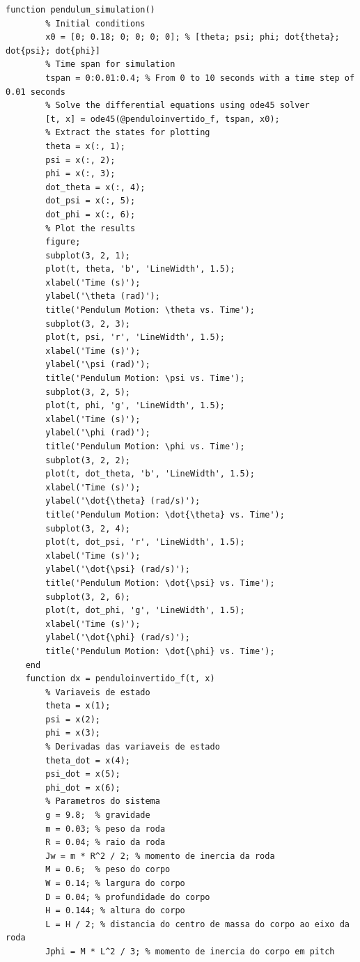 \documentclass[10pt]{article}
\begin{document}
\begin{appendices}
\begin{lstlisting}[caption={Código da simulação do sistema com ode45}, label=lst:pendulum_sim_l]
    function pendulum_simulation()
        % Initial conditions
        x0 = [0; 0.18; 0; 0; 0; 0]; % [theta; psi; phi; dot{theta}; dot{psi}; dot{phi}]
        % Time span for simulation
        tspan = 0:0.01:0.4; % From 0 to 10 seconds with a time step of 0.01 seconds
        % Solve the differential equations using ode45 solver
        [t, x] = ode45(@penduloinvertido_f, tspan, x0);
        % Extract the states for plotting
        theta = x(:, 1);
        psi = x(:, 2);
        phi = x(:, 3);
        dot_theta = x(:, 4);
        dot_psi = x(:, 5);
        dot_phi = x(:, 6);
        % Plot the results
        figure;
        subplot(3, 2, 1);
        plot(t, theta, 'b', 'LineWidth', 1.5);
        xlabel('Time (s)');
        ylabel('\theta (rad)');
        title('Pendulum Motion: \theta vs. Time');
        subplot(3, 2, 3);
        plot(t, psi, 'r', 'LineWidth', 1.5);
        xlabel('Time (s)');
        ylabel('\psi (rad)');
        title('Pendulum Motion: \psi vs. Time');
        subplot(3, 2, 5);
        plot(t, phi, 'g', 'LineWidth', 1.5);
        xlabel('Time (s)');
        ylabel('\phi (rad)');
        title('Pendulum Motion: \phi vs. Time');
        subplot(3, 2, 2);
        plot(t, dot_theta, 'b', 'LineWidth', 1.5);
        xlabel('Time (s)');
        ylabel('\dot{\theta} (rad/s)');
        title('Pendulum Motion: \dot{\theta} vs. Time');
        subplot(3, 2, 4);
        plot(t, dot_psi, 'r', 'LineWidth', 1.5);
        xlabel('Time (s)');
        ylabel('\dot{\psi} (rad/s)');
        title('Pendulum Motion: \dot{\psi} vs. Time');
        subplot(3, 2, 6);
        plot(t, dot_phi, 'g', 'LineWidth', 1.5);
        xlabel('Time (s)');
        ylabel('\dot{\phi} (rad/s)');
        title('Pendulum Motion: \dot{\phi} vs. Time');
    end
    function dx = penduloinvertido_f(t, x)
        % Variaveis de estado
        theta = x(1);
        psi = x(2);
        phi = x(3);
        % Derivadas das variaveis de estado
        theta_dot = x(4);
        psi_dot = x(5);
        phi_dot = x(6);
        % Parametros do sistema
        g = 9.8;  % gravidade
        m = 0.03; % peso da roda
        R = 0.04; % raio da roda
        Jw = m * R^2 / 2; % momento de inercia da roda
        M = 0.6;  % peso do corpo
        W = 0.14; % largura do corpo
        D = 0.04; % profundidade do corpo
        H = 0.144; % altura do corpo
        L = H / 2; % distancia do centro de massa do corpo ao eixo da roda
        Jphi = M * L^2 / 3; % momento de inercia do corpo em pitch

\end{lstlisting}
\end{appendices}
\end{document}
